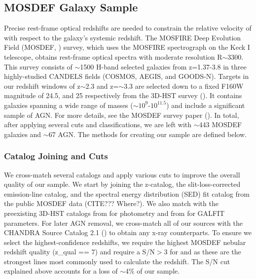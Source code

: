 \documentclass[linenumbers,amsmath,trackchanges,preprint2]{aastex702}
\begin{document}
\subsection{MOSDEF Galaxy Sample}
\par Precise rest-frame optical redshifts are needed to constrain the relative velocity of \lya with respect to the galaxy's systemic redshift. The MOSFIRE Deep Evolution Field (MOSDEF, \cite{kriek2015}) survey, which uses the MOSFIRE spectrograph on the Keck I telescope, obtains rest-frame optical spectra with moderate resolution R$\sim$3300. This survey consists of $\sim$1500 H-band selected galaxies from z=1.37-3.8 in three highly-studied CANDELS fields (COSMOS, AEGIS, and GOODS-N). Targets in our redshift windows of z$\sim$2.3 and z=$\sim$3.3 are selected down to a fixed F160W magnitude of 24.5, and 25 respectively from the 3D-HST survey (\cite{skelton2014}). It contains galaxies spanning a wide range of masses ($\sim$$10^9$-$10^{11.5}$\Msun) and include a significant sample of AGN. For more details, see the MOSDEF survey paper (\cite{kriek2015}). In total, after applying several cuts and classifications, we are left with $\sim$443 MOSDEF galaxies and $\sim$67 AGN. The methods for creating our sample are defined below.
\subsubsection{Catalog Joining and Cuts}
\par We cross-match several catalogs and apply various cuts to improve the overall quality of our sample. We start by joining the z-catalog, the slit-loss-corrected emission-line catalog, and the spectral energy distribution (SED) fit catalog from the public MOSDEF data (CITE??? Where?). We also match with the preexisting 3D-HST catalogs from \cite{skelton2014} for photometry and from \cite{vanderWel2014} for GALFIT parameters. For later AGN removal, we cross-match all of our sources with the CHANDRA Source Catalog 2.1 (\cite{evans2024}) to obtain any x-ray counterparts. To ensure we select the highest-confidence redshifts, we require the highest MOSDEF nebular redshift quality (z\_qual == 7) and require a S/N$>3$ for \Ha and \OIII as these are the strongest lines most commonly used to calculate the redshift. The S/N cut explained above accounts for a loss of $\sim$4\% of our sample.

\end{document}
